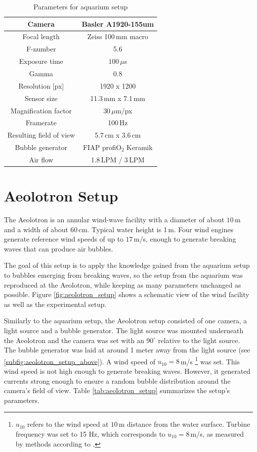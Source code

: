 		\begin{table}[h]
			\centering
		
			\begin{tabular}{|c|c|}
			\hline 
			Camera & Basler A1920-155um \\ 
			\hline 
			Focal length & Zeiss 100\,mm macro \\ 
			\hline 
			F-number & 5.6 \\ 
			\hline 
			Exposure time & $100 \, \mu$s \\ 
			\hline 
			Gamma & 0.8 \\
			\hline
			Resolution [px] &1920 x 1200 \\
			\hline 
			Sensor size & 11.3\,mm x 7.1\,mm \\
			\hline 
			Magnification factor & $30 \, \mu$m/px \\ 
			\hline 
			Framerate & 100\,Hz \\ 
			\hline 
			Resulting field of view & 5.7\,cm x 3.6\,cm \\
			\hline
			Bubble generator & FIAP profiO$_2$ Keramik\\			
			\hline
			Air flow & 1.8\,LPM / 3\,LPM \\ 
			\hline
			\end{tabular} 
			
			\caption{Parameters for aquarium setup}
			\label{tab:aquarium_param}

		\end{table}
		
	\section{Aeolotron Setup}\label{aeolotron_setup}
		The Aeolotron is an annular wind-wave facility with a diameter of about $10$\,m and a width of about $60$\,cm. Typical water height is 1\,m. Four wind engines generate reference wind speeds of up to $17$\,m/s, enough to generate breaking waves that can produce air bubbles. 
		
		The goal of this setup is to apply the knowledge gained from the aquarium setup to bubbles emerging from breaking waves, so the setup from the aquarium was reproduced at the Aeolotron, while keeping as many parameters unchanged as possible. Figure \ref{fig:aeolotron_setup} shows a schematic view of the wind facility as well as the experimental setup. 
		
		Similarly to the aquarium setup, the Aeolotron setup consisted of one camera, a light source and a bubble generator. 
		The light source was mounted underneath the Aeolotron and the camera was set with an $90^\circ$ relative to the light source. The bubble generator was laid at around 1 meter away from the light source (see \ref{subfig:aeolotron_setup_above}). A wind speed of $u_{10} = 8$\,m/s \footnote{$u_{10}$ refers to the wind speed at $10$\,m distance from the water surface. Turbine frequency was set to 15 Hz, which corresponds to $u_{10} = 8$\,m/s, as measured by methods according to \citet{Bopp2011}.} was set. This wind speed is not high enough to generate breaking waves. However, it generated currents strong enough to ensure a random bubble distribution around the camera's field of view. Table \ref{tab:aeolotron_setup} summarizes the setup's parameters.
	
